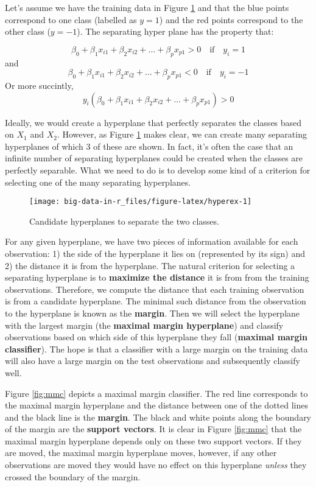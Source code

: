 \documentclass[]{book}
\begin{document}
Let's assume we have the training data in Figure \ref{fig:hyperex} and that the blue points correspond to one class (labelled as \(y = 1\)) and the red points correspond to the other class (\(y = -1\)). The separating hyper plane has the property that:

\[
\beta_0 + \beta_1x_{i1} + \beta_2x_{i2} + \dots + \beta_px_{p1} > 0 \quad \text{if} \quad y_i = 1
\]
and
\[
\beta_0 + \beta_1x_{i1} + \beta_2x_{i2} + \dots + \beta_px_{p1} < 0 \quad \text{if} \quad y_i = -1
\]
Or more succintly,
\[
y_i(\beta_0 + \beta_1x_{i1} + \beta_2x_{i2} + \dots + \beta_px_{p1}) > 0
\]

Ideally, we would create a hyperplane that perfectly separates the classes based on \(X_1\) and \(X_2\). However, as Figure \ref{fig:hyperex} makes clear, we can create many separating hyperplanes of which 3 of these are shown. In fact, it's often the case that an infinite number of separating hyperplanes could be created when the classes are perfectly separable. What we need to do is to develop some kind of a criterion for selecting one of the many separating hyperplanes.

\begin{figure}
\texttt{[image: big-data-in-r\_files/figure-latex/hyperex-1]} \caption{Candidate hyperplanes to separate the two classes.}\label{fig:hyperex}
\end{figure}

For any given hyperplane, we have two pieces of information available for each observation: 1) the side of the hyperplane it lies on (represented by its sign) and 2) the distance it is from the hyperplane. The natural criterion for selecting a separating hyperplane is to \textbf{maximize the distance} it is from from the training observations. Therefore, we compute the distance that each training observation is from a candidate hyperplane. The minimal such distance from the observation to the hyperplane is known as the \textbf{margin}. Then we will select the hyperplane with the largest margin (the \textbf{maximal margin hyperplane}) and classify observations based on which side of this hyperplane they fall (\textbf{maximal margin classifier}). The hope is that a classifier with a large margin on the training data will also have a large margin on the test observations and subsequently classify well.

Figure \ref{fig:mmc} depicts a maximal margin classifier. The red line corresponds to the maximal margin hyperplane and the distance between one of the dotted lines and the black line is the \textbf{margin}. The black and white points along the boundary of the margin are the \textbf{support vectors}. It is clear in Figure \ref{fig:mmc} that the maximal margin hyperplane depends only on these two support vectors. If they are moved, the maximal margin hyperplane moves, however, if any other observations are moved they would have no effect on this hyperplane \emph{unless} they crossed the boundary of the margin.
\end{document}
